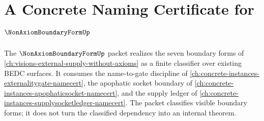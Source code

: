 \chapter{A Concrete Naming Certificate for $\NonAxiomBoundaryFormUp$}
\label{ch:concrete-instances-nonaxiomboundaryform-namecert}

The $\NonAxiomBoundaryFormUp$ packet realizes the seven boundary forms of \autoref{ch:visions-external-supply-without-axioms} as a finite classifier over existing BEDC surfaces. It consumes the name-to-gate discipline of \autoref{ch:concrete-instances-externalitygate-namecert}, the apophatic socket boundary of \autoref{ch:concrete-instances-apophaticsocket-namecert}, and the supply ledger of \autoref{ch:concrete-instances-supplysocketledger-namecert}. The packet classifies visible boundary forms; it does not turn the classified dependency into an internal theorem.


